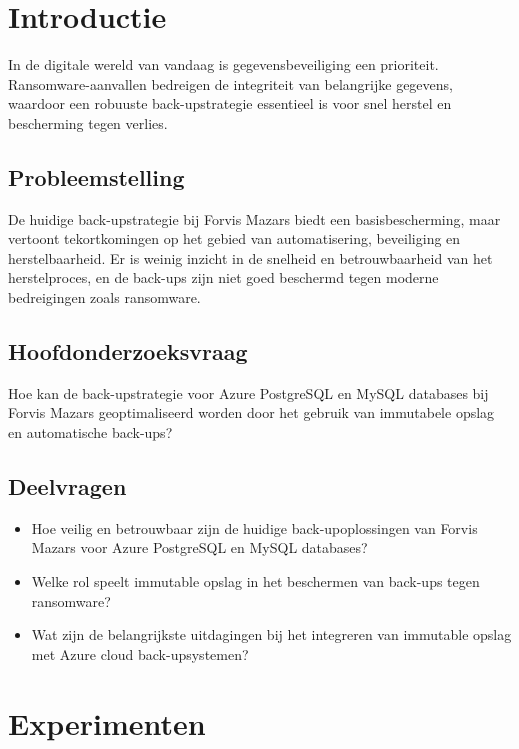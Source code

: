 \documentclass[a0,portrait]{hogent-poster}
\begin{document}
\begin{multicols}{2} %

\section*{Introductie}

In de digitale wereld van vandaag is gegevensbeveiliging een prioriteit. Ransomware-aanvallen bedreigen de integriteit van belangrijke gegevens, waardoor een robuuste back-upstrategie essentieel is voor snel herstel en bescherming tegen verlies.

\subsection*{Probleemstelling}  
De huidige back-upstrategie bij Forvis Mazars biedt een basisbescherming, maar vertoont tekortkomingen op het gebied van automatisering, beveiliging en herstelbaarheid. Er is weinig inzicht in de snelheid en betrouwbaarheid van het herstelproces, en de back-ups zijn niet goed beschermd tegen moderne bedreigingen zoals ransomware.

\subsection*{Hoofdonderzoeksvraag}  
Hoe kan de back-upstrategie voor Azure PostgreSQL en MySQL databases bij Forvis Mazars geoptimaliseerd worden door het gebruik van immutabele opslag en automatische back-ups?

\subsection*{Deelvragen}  
\begin{itemize}
    \item Hoe veilig en betrouwbaar zijn de huidige back-upoplossingen van Forvis Mazars voor Azure PostgreSQL en MySQL databases?
    \item Welke rol speelt immutable opslag in het beschermen van back-ups tegen ransomware?
    \item Wat zijn de belangrijkste uitdagingen bij het integreren van immutable opslag met Azure cloud back-upsystemen?
\end{itemize}

\section{Experimenten}


\end{multicols}
\end{document}
